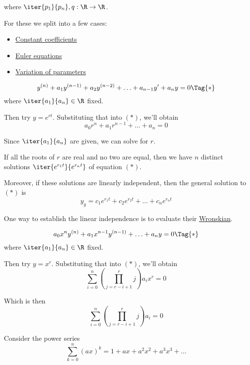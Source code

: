 where $\iter{p_1}{p_n},q:\R\to\R$.

For these we split into a few cases:
\begin{itemize}
  \item\href{cd8a29a}{Constant coefficients}
  \item\href{a0f8e0c}{Euler equations}
  \item\href{de785b7}{Variation of parameters}
\end{itemize}

\label{cd8a29a}


\begin{equation*}\def\y#1{y^{(#1)}}
  \y n+a_1\y{n-1}+a_2\y{n-2}+\ldots+a_{n-1}y'+a_ny=0\Tag{*}
\end{equation*}
where $\iter{a_1}{a_n}\in\R$ fixed.

Then try $y=e^{rt}$. Substituting that into $(*)$, we'll obtain
$$a_0r^n+a_1r^{n-1}+\ldots+a_n=0$$

Since $\iter{a_1}{a_n}$ are given, we can solve for $r$.

If all the roots of $r$ are real and no two are equal, then we have $n$
distinct solutions $\iter{e^{r_1t}}{e^{r_nt}}$ of equation $(*)$.

Moreover, if these solutions are linearly independent, then the general
solution to $(*)$ is
$$y_g=c_1e^{r_1t}+c_2e^{r_2t}+\ldots+c_ne^{r_nt}$$

One way to establish the linear independence is to evaluate their
\href{b70073b}{Wronskian}.

\label{a0f8e0c}

\begin{equation*}\def\y#1{x^{#1}y^{(#1)}}
  a_0\y{n}+a_1\y{n-1}+\ldots+a_ny=0\Tag{*}
\end{equation*}
where $\iter{a_1}{a_n}\in\R$ fixed.

Then try $y=x^{r}$. Substituting that into $(*)$, we'll obtain
$$
  \sum_{i=0}^n\left(\prod_{j=r-i+1}^rj\right) a_ix^r=0
$$

Which is then
$$
  \sum_{i=0}^n\left(\prod_{j=r-i+1}^rj\right) a_i=0
$$

\label{de785b7}

\label{ea9daf1}

Consider the power series
$$
  \sum_{k=0}^n(ax)^k=1+ax+a^2x^2+a^3x^3+\ldots
$$

